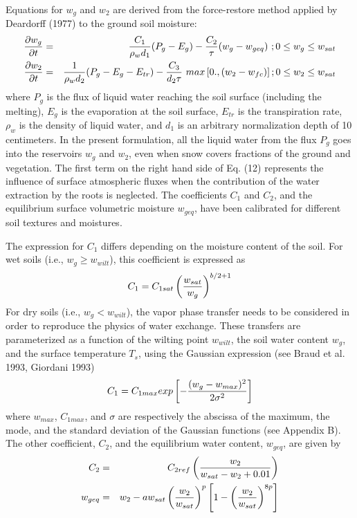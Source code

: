 Equations for $w_g$ and $w_2$ are derived from the force-restore
method applied by Deardorff (1977) to the ground soil moisture:
\begin{eqnarray}
{\partial w_g \over \partial t}&=&{ C_1 \over \rho_w d_1}
(P_g - E_g) - {C_2 \over \tau} ( w_g - w_{geq} ) \ ;
0 \leq w_g \leq w_{sat} \\
{\partial w_2 \over \partial t}&=&{1 \over \rho_w d_2}
(P_g - E_g - E_{tr}) - { C_3 \over d_2 \tau} \ max
\left[ 0., ( w_2 - w_{fc} ) \right] ; 0 \leq w_2 \leq w_{sat}
\end{eqnarray}
where $P_g$ is the flux of liquid water reaching the soil surface
(including the melting),
$E_g$ is the evaporation at the soil surface,
$E_{tr}$ is the transpiration rate,
$\rho_w$ is the density of liquid water,
and $d_1$ is an arbitrary normalization depth of 10 centimeters.
In the present formulation, all the liquid water from
the flux $P_g$ goes into the
reservoirs $w_g$ and $w_2$, even when snow covers fractions of the
ground and vegetation.
The first term on the right hand side of Eq. (12) represents
the influence of surface atmospheric fluxes when the
contribution of the water extraction by the roots is neglected.
The coefficients $C_1$ and $C_2$, and the equilibrium surface volumetric
moisture $w_{geq}$,
have been calibrated for different soil textures and
moistures.

The expression for $C_1$ differs depending on the moisture content
of the soil.  For wet soils
(i.e., $w_g \geq w_{wilt}$), this coefficient is expressed as
\begin{eqnarray}
C_1 = C_{1sat} \left( {w_{sat} \over w_g} \right)^{b/2+1}
\end{eqnarray}
For dry soils (i.e., $w_g < w_{wilt}$),
the vapor phase transfer needs to be considered in order to reproduce the
physics of water exchange.  These transfers are parameterized
as a function of the wilting point $w_{wilt}$, the soil water
content $w_g$,
and the surface temperature $T_s$, using the Gaussian expression
(see Braud et al. 1993, Giordani 1993)
\begin{eqnarray}
C_1 = C_{1max} exp \left[ - { (w_g-w_{max})^2 \over 2 \sigma^2 } \right]
\end{eqnarray}
where $w_{max}$, $C_{1max}$, and $\sigma$ are respectively the abscissa
of the maximum, the mode, and the standard deviation of the
Gaussian functions (see Appendix B).
The other coefficient, $C_2$, and the equilibrium water
content, $w_{geq}$, are given by
\begin{eqnarray}
C_2&=&C_{2ref} \left( {w_2 \over w_{sat}-w_2+0.01} \right) \\
w_{geq}&=&w_2 - a w_{sat} \left( { w_2 \over w_{sat}} \right)^p
\left[ 1 - \left({ w_2 \over w_{sat}} \right)^{8p} \right]
\end{eqnarray}


